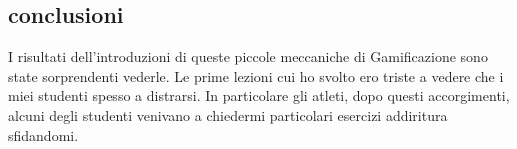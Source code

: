 \subsection{conclusioni}

I risultati dell'introduzioni di queste piccole meccaniche di Gamificazione sono state sorprendenti vederle. Le prime lezioni cui ho svolto ero triste a vedere che i miei studenti spesso a distrarsi. In particolare gli atleti, dopo questi accorgimenti, alcuni degli studenti venivano a chiedermi particolari esercizi addiritura sfidandomi.
